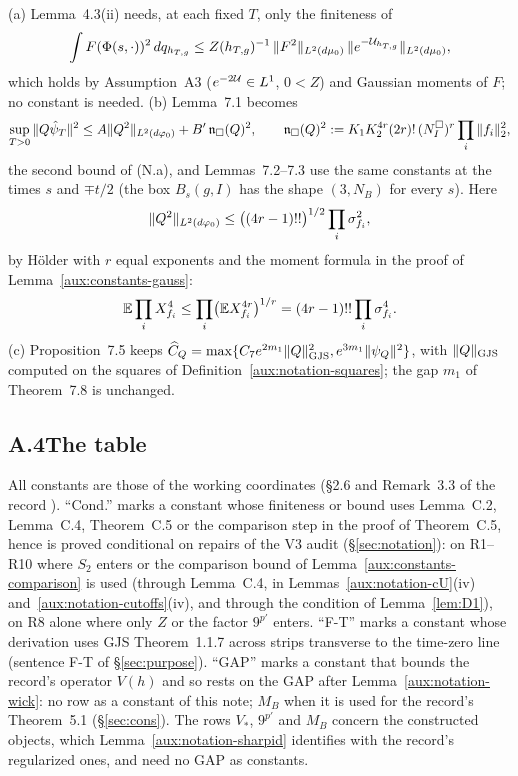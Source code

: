 \begin{auxrem}\label{aux:constants-other}
(a) Lemma~4.3(ii) \cite[p.~17]{R} needs, at each fixed $T$, only the finiteness of
\[
 \int F(\Phi(s,\cdot))^2\,dq_{h_{T,g}}\le Z(h_{T,g})^{-1}\,\|F^2\|_{L^2(d\mu_0)}\,
 \|e^{-\mathcal U_{h_{T,g}}}\|_{L^2(d\mu_0)},
\]
which holds by Assumption~A3 ($e^{-2\mathcal U}\in L^1$, $0<Z$) and Gaussian moments of $F$; no
constant is needed.  (b) Lemma~7.1 becomes
\[
 \sup_{T>0}\|Q\hat\psi_T\|^2\le A\|Q^2\|_{L^2(d\varphi_0)}+B'\,\mathfrak n_\square(Q)^2,\qquad
 \mathfrak n_\square(Q)^2:=K_1K_2^{4r}(2r)!\,(N^{\square}_I)^r\prod_i\|f_i\|_2^2 ,
\]
the second bound of (N.a), and Lemmas~7.2--7.3 use the same constants at the times $s$ and $\mp t/2$ (the
box $B_s(g,I)$ has the shape $(3,N_B)$ for every $s$).  Here
\[
 \|Q^2\|_{L^2(d\varphi_0)}\le\bigl((4r-1)!!\bigr)^{1/2}\prod_i\sigma_{f_i}^2 ,
\]
by H\"older with $r$ equal exponents and the moment formula in the proof of
Lemma~\ref{aux:constants-gauss}:
\[
 \mathbb{E}\prod_iX_{f_i}^4\le\prod_i\bigl(\mathbb{E} X_{f_i}^{4r}\bigr)^{1/r}=(4r-1)!!\prod_i\sigma_{f_i}^4 .
\]
(c) Proposition~7.5 keeps
$\widehat C_Q=\max\{C_7e^{2m_1}\lVert Q\rVert_{\mathrm{GJS}}^2,e^{3m_1}\|\psi_Q\|^2\}$, with $\lVert Q\rVert_{\mathrm{GJS}}$ computed on the
squares of Definition~\ref{aux:notation-squares}; the gap $m_1$ of Theorem~7.8 is unchanged.
\end{auxrem}

\subsection*{A.4\quad The table}

All constants are those of the working coordinates (\S2.6 and Remark~3.3 of the record
\cite[pp.~14, 16]{R}).  ``Cond.'' marks a constant whose finiteness or bound uses Lemma~C.2,
Lemma~C.4, Theorem~C.5 or the comparison step in the proof of Theorem~C.5, hence is proved
conditional on repairs of the V3 audit (\S\ref{sec:notation}): on R1--R10 where $S_2$ enters or
the comparison bound of Lemma~\ref{aux:constants-comparison} is used (through Lemma~C.4, in
Lemmas~\ref{aux:notation-cU}(iv) and~\ref{aux:notation-cutoffs}(iv), and through the condition of
Lemma~\ref{lem:D1}), on R8 alone where only $Z$ or the factor $9^{p'}$ enters.  ``F-T'' marks a constant whose
derivation uses GJS Theorem~1.1.7 across strips transverse to the time-zero line (sentence F-T
of \S\ref{sec:purpose}).  ``GAP'' marks a constant that bounds the record's operator $V(h)$ and
so rests on the GAP after Lemma~\ref{aux:notation-wick}: no row as a constant of this note;
$M_B$ when it is used for the record's Theorem~5.1 (\S\ref{sec:cons}).  The rows $V_*$,
$9^{p'}$ and $M_B$ concern the constructed objects, which Lemma~\ref{aux:notation-sharpid}
identifies with the record's regularized ones, and need no GAP as constants.


